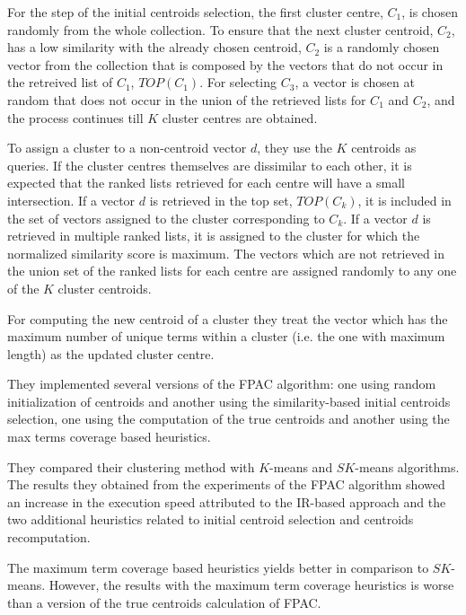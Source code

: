 \documentclass[runningheads]{llncs}
\begin{document}
For the step of the initial centroids selection, the first cluster centre, $C_1$, is chosen randomly from
the whole collection. To ensure that the next cluster centroid, $C_2$, has a low similarity with the already chosen centroid, $C_2$ is a randomly chosen vector from the collection
that is composed by the vectors that do not occur in the retreived list of 
$C_1$, $TOP(C_1)$. For selecting $C_3$, a vector is chosen at random that
does not occur in the union of the retrieved lists for $C_1$ and $C_2$, and
the process continues till $K$ cluster centres are obtained.

To assign a cluster to a non-centroid vector $d$, they use the $K$ centroids
as queries. If the cluster centres themselves are dissimilar to
each other, it is expected that the ranked lists retrieved for each
centre will have a small intersection. If a vector $d$
is retrieved in the top set, $TOP(C_k)$,
it is included in the set of vectors assigned to the cluster corresponding
to $C_k$. If a vector $d$ is retrieved in multiple ranked lists, 
it is assigned to the cluster for which the normalized
similarity score is maximum. The vectors which are not retrieved in the
union set of the ranked lists for each 
centre are assigned randomly to any one of the $K$ cluster centroids.

For computing the new centroid of a cluster they treat the vector 
which has the maximum number of unique terms within a cluster (i.e. 
the one with maximum length) as the updated cluster centre.

They implemented several versions of the FPAC
algorithm: one using random initialization of 
centroids and another using the similarity-based
initial centroids selection, one using 
the computation of the true centroids and another using
the max terms coverage based heuristics. 

They compared their clustering method with 
$K$-means \cite{lloyd_1982} and $SK$-means 
\cite{Broder:2014:SKR:2556195.2556260} algorithms.
The results they obtained from the experiments of the FPAC algorithm
showed an increase in the execution speed attributed to the IR-based 
approach and the two additional heuristics related to initial 
centroid selection and centroids recomputation.

The maximum term coverage based heuristics yields better in
comparison to $SK$-means. However, the results with the
maximum term coverage heuristics is worse than a version of
the true centroids calculation of FPAC.
\end{document}
